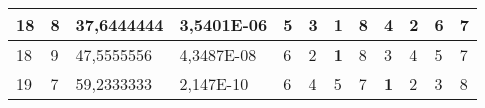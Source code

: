 \documentclass[conference]{IEEEtran}
\begin{document}
\begin{table*}[]
\begin{tabular}{|llll|llllllll|}
\multicolumn{1}{|l|}{18}                                                    & \multicolumn{1}{l|}{8}                                                        & \multicolumn{1}{l|}{37,6444444}                                                   & 3,5401E-06                     & \multicolumn{1}{l|}{5}                                                  & \multicolumn{1}{l|}{3}                                                  & \multicolumn{1}{l|}{\textbf{1}}                                         & \multicolumn{1}{l|}{8}                                                  & \multicolumn{1}{l|}{4}                                                  & \multicolumn{1}{l|}{2}                                                  & \multicolumn{1}{l|}{6}                                                  & 7                          \\ \hline
\multicolumn{1}{|l|}{18}                                                    & \multicolumn{1}{l|}{9}                                                        & \multicolumn{1}{l|}{47,5555556}                                                   & 4,3487E-08                     & \multicolumn{1}{l|}{6}                                                  & \multicolumn{1}{l|}{2}                                                  & \multicolumn{1}{l|}{\textbf{1}}                                         & \multicolumn{1}{l|}{8}                                                  & \multicolumn{1}{l|}{3}                                                  & \multicolumn{1}{l|}{4}                                                  & \multicolumn{1}{l|}{5}                                                  & 7                          \\ \hline
\multicolumn{1}{|l|}{19}                                                    & \multicolumn{1}{l|}{7}                                                        & \multicolumn{1}{l|}{59,2333333}                                                   & 2,147E-10                      & \multicolumn{1}{l|}{6}                                                  & \multicolumn{1}{l|}{4}                                                  & \multicolumn{1}{l|}{5}                                                  & \multicolumn{1}{l|}{7}                                                  & \multicolumn{1}{l|}{\textbf{1}}                                         & \multicolumn{1}{l|}{2}                                                  & \multicolumn{1}{l|}{3}                                                  & 8                          \\ \hline

\end{tabular}
\end{table*}
\end{document}
